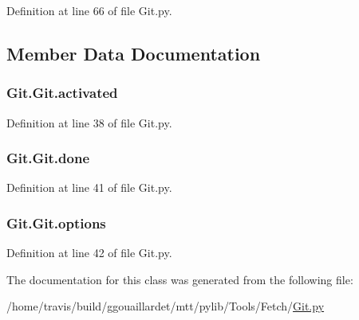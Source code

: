 Definition at line 66 of file Git.\-py.



\subsection{Member Data Documentation}
\hypertarget{classGit_1_1Git_a22d3012cb93bad0a9122dd84afdfeee9}{
\subsubsection[{activated}]{\setlength{\rightskip}{0pt plus 5cm}Git.\-Git.\-activated}}\label{classGit_1_1Git_a22d3012cb93bad0a9122dd84afdfeee9}


Definition at line 38 of file Git.\-py.

\hypertarget{classGit_1_1Git_adb8991008d4bb4568fa9c2f991711cda}{
\subsubsection[{done}]{\setlength{\rightskip}{0pt plus 5cm}Git.\-Git.\-done}}\label{classGit_1_1Git_adb8991008d4bb4568fa9c2f991711cda}


Definition at line 41 of file Git.\-py.

\hypertarget{classGit_1_1Git_a7560b88b014c5da8785739c7bb6283ed}{
\subsubsection[{options}]{\setlength{\rightskip}{0pt plus 5cm}Git.\-Git.\-options}}\label{classGit_1_1Git_a7560b88b014c5da8785739c7bb6283ed}


Definition at line 42 of file Git.\-py.



The documentation for this class was generated from the following file\-:\begin{DoxyCompactItemize}
\item 
/home/travis/build/ggouaillardet/mtt/pylib/\-Tools/\-Fetch/\hyperlink{Git_8py}{Git.\-py}\end{DoxyCompactItemize}
